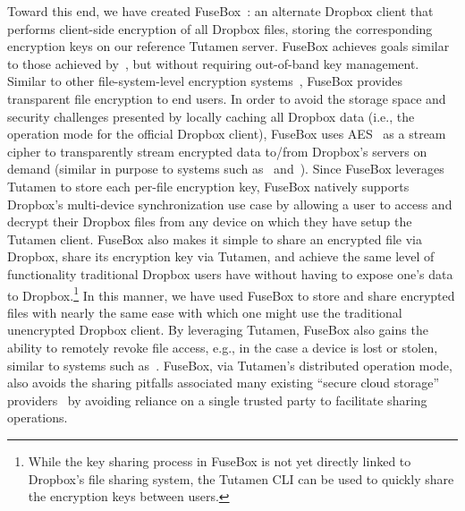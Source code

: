 Toward this end, we have created FuseBox~\cite{fusebox}: an alternate
Dropbox client that performs client-side encryption of all Dropbox
files, storing the corresponding encryption keys on our reference
Tutamen server. FuseBox achieves goals similar to those achieved
by~\cite{goh2003}, but without requiring out-of-band key
management. Similar to other file-system-level encryption
systems~\cite{blaze1993, Cattaneo2001, halcrow}, FuseBox provides
transparent file encryption to end users. In order to avoid the
storage space and security challenges presented by locally caching all
Dropbox data (i.e., the operation mode for the official Dropbox
client), FuseBox uses AES~\cite{daemen1999, nist2001} as a stream
cipher to transparently stream encrypted data to/from Dropbox's
servers on demand (similar in purpose to systems such
as~\cite{tang2012} and~\cite{xia2015}). Since FuseBox leverages
Tutamen to store each per-file encryption key, FuseBox natively
supports Dropbox's multi-device synchronization use case by allowing a
user to access and decrypt their Dropbox files from any device on
which they have setup the Tutamen client. FuseBox also makes it simple
to share an encrypted file via Dropbox, share its encryption key via
Tutamen, and achieve the same level of functionality traditional
Dropbox users have without having to expose one's data to
Dropbox.\footnote{While the key sharing process in FuseBox is not yet
  directly linked to Dropbox's file sharing system, the Tutamen CLI
  can be used to quickly share the encryption keys between users.} In
this manner, we have used FuseBox to store and share encrypted files
with nearly the same ease with which one might use the traditional
unencrypted Dropbox client. By leveraging Tutamen, FuseBox also gains
the ability to remotely revoke file access, e.g., in the case a device
is lost or stolen, similar to systems such
as~\cite{geambasu2011}. FuseBox, via Tutamen's distributed operation
mode, also avoids the sharing pitfalls associated many existing
``secure cloud storage'' providers~\cite{wilson2014} by avoiding
reliance on a single trusted party to facilitate sharing operations.

